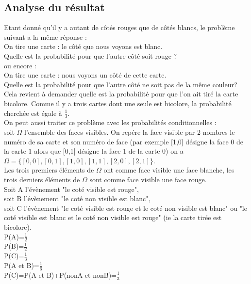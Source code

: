\documentclass[a4paper,11pt]{book}
\begin{document}
\subsection{Analyse du r\'esultat}
Etant donn\'e qu'il y a autant de c\^ot\'es rouges que de c\^ot\'es  blancs, 
le probl\`eme suivant a la m\^eme r\'eponse :\\
On tire une carte : le c\^ot\'e que nous voyons est blanc.\\
Quelle est la probabilit\'e pour que l'autre c\^ot\'e soit rouge ?\\
ou encore :\\
On tire une carte : nous voyons un c\^ot\'e de cette carte.\\
Quelle est la probabilit\'e pour que l'autre c\^ot\'e ne soit pas de la 
m\^eme couleur?\\   
Cela revient \`a demander quelle est la probabilit\'e pour que l'on ait tir\'e
la carte bicolore. Comme il y a trois cartes dont une seule est bicolore,
 la probabilit\'e cherch\'ee est \'egale \`a $\frac{1}{3}$.\\  
On peut aussi traiter ce probl\`eme avec les probabilit\'es conditionnelles :\\
soit $\Omega$ l'ensemble des faces visibles. On rep\'ere la face visible par
 2 nombres le num\'ero de sa carte et son num\'ero de face (par exemple [1,0] 
d\'esigne la face 0 de la carte 1 alors que  [0,1] 
d\'esigne la face 1 de la carte 0) on a \\
 $\Omega=\{[0,0],[0,1],[1,0],[1,1],[2,0],[2,1]\}$.\\ 
Les trois premiers \'el\'ements de $\Omega$ ont comme face visible une face
blanche, les trois derniers \'el\'ements de $\Omega$ sont comme face visible 
une face rouge.\\
Soit A l'\'ev\`enement "le cot\'e visible est rouge",\\
soit B l'\'ev\`enement "le cot\'e non visible est blanc",\\
soit C l'\'ev\`enement "le cot\'e visible est rouge et le cot\'e non visible 
est blanc" ou "le cot\'e visible est blanc et le cot\'e non visible est rouge"
 (ie la carte tir\'ee est bicolore).\\
P(A)=$\displaystyle \frac{1}{2}$\\
P(B)=$\displaystyle \frac{1}{2}$\\
P(C)=$\displaystyle \frac{1}{3}$\\
P(A et B)=$\displaystyle \frac{1}{6}$\\
P(C)=P(A et B)+P(nonA et nonB)=$\displaystyle \frac{1}{3}$\\
\end{document}
